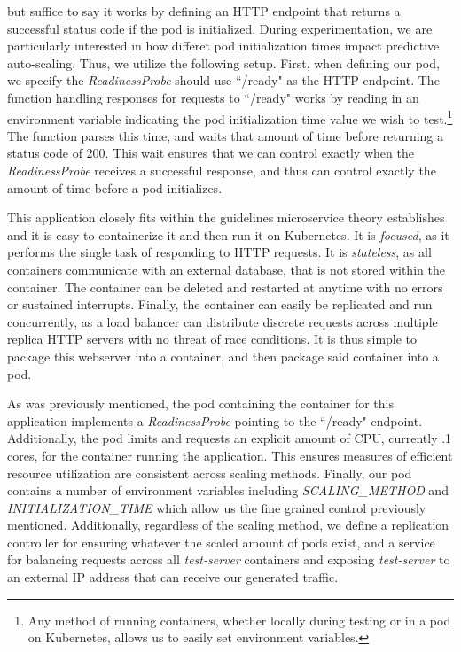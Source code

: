 \begin{itemize}
    but suffice to say it works by defining an HTTP endpoint that returns a
    successful status code if the pod is initialized. During experimentation, we
    are particularly interested in how differet pod initialization times impact
    predictive auto-scaling. Thus, we utilize the following setup.
    First, when defining our pod, we specify the \textit{ReadinessProbe} should
    use ``/ready" as the HTTP endpoint. The function handling responses for
    requests to ``/ready" works by reading in an environment variable indicating
    the pod initialization time value we wish to test.\footnote{Any method of
    running containers, whether locally during testing or in a pod on
    Kubernetes, allows us to easily set environment variables.} The function parses this
    time, and waits that amount of time before returning a status code of 200.
    This wait ensures that we can control exactly when the
    \textit{ReadinessProbe} receives a successful response, and thus can
    control exactly the amount of time before a pod initializes.
\end{itemize}

This application closely fits within the guidelines microservice theory
establishes and it is easy to containerize it and then run it on Kubernetes. It
is \textit{focused}, as it performs the single task of responding to HTTP
requests. It is \textit{stateless}, as all containers communicate with an
external database, that is not stored within the container. The container can be
deleted and restarted at anytime with no errors or sustained interrupts.
Finally, the container can easily be replicated and run concurrently, as
a load balancer can distribute discrete requests across multiple replica HTTP
servers with no threat of race conditions. It is thus simple to package this
webserver into a container, and then package said container into a pod.

As was previously mentioned, the pod containing the container for this
application implements a \textit{ReadinessProbe} pointing to the ``/ready"
endpoint. Additionally, the pod limits and requests an explicit amount of CPU,
currently .1 cores, for the container running the application. This ensures
measures of efficient resource utilization are consistent across scaling methods.
Finally, our pod contains a number of environment variables including
\textit{SCALING\_METHOD} and \textit{INITIALIZATION\_TIME} which allow us the
fine grained control previously mentioned. Additionally,
regardless of the scaling method, we define a replication controller for
ensuring whatever the scaled amount of pods exist, and a service for balancing
requests across all \textit{test-server} containers and exposing
\textit{test-server} to an external IP address that can receive our generated
traffic.

